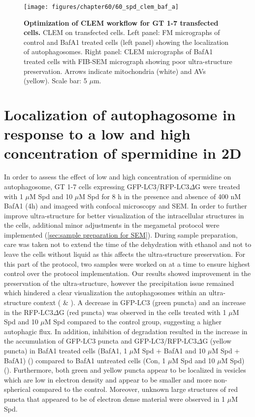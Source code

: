 \begin{landscape}
\begin{figure}[!htbp]
\center
  \texttt{[image: figures/chapter60/60\_spd\_clem\_baf\_a]}
  \caption[Optimization of CLEM workflow for GT 1-7 transfected cells]{\textbf{Optimization of CLEM workflow for GT 1-7 transfected cells.} CLEM on transfected cells. Left panel: FM micrographs of control and BafA1 treated cells (left panel) showing the localization of autophagosomes. Right panel: CLEM micrographs of BafA1 treated cells with FIB-SEM micrograph showing poor ultra-structure preservation. Arrows indicate mitochondria (white) and AVs (yellow). Scale bar: 5 $\mu$m.}
  \label{fig:60_spd_clem_baf_a}
\end{figure} 
\end{landscape}

\section{Localization of autophagosome in response to a low and high concentration of spermidine in 2D}
In order to assess the effect of low and high concentration of spermidine on autophagosome, GT 1-7 cells expressing GFP-LC3/RFP-LC3$\Delta$G were treated with 1 $\mu$M Spd and 10 $\mu$M Spd for 8 h in the presence and absence of 400 nM BafA1 (4h) and imageed with confocal microscopy and SEM. In order to further improve ultra-structure for better visualization of the intracellular structures in the cells, additional minor adjustments in the megametal protocol were implemented (\cref{sec:sample preparation for SEM}). During sample preparation, care was taken not to extend the time of the dehydration with ethanol and not to leave the cells without liquid as this affects the ultra-structure preservation. For this part of the protocol, two samples were worked on at a time to ensure highest control over the protocol implementation. Our results showed improvement in the preservation of the ultra-structure, however the precipitation issue remained which hindered a clear visualization the autophagosomes within an ultra-structure context ( \& ). A decrease in GFP-LC3 (green puncta) and an increase in the RFP-LC3$\Delta$G (red puncta) was observed in the cells treated with 1 $\mu$M Spd and 10 $\mu$M Spd compared to the control group, suggesting a higher autophagic flux. In addition, inhibition of degradation resulted in the increase in the accumulation of GFP-LC3 puncta  and GFP-LC3/RFP-LC3$\Delta$G (yellow puncta) in BafA1 treated cells (BafA1, 1 $\mu$M Spd + BafA1 and 10 $\mu$M Spd + BafA1) () compared to BafA1 untreated cells (Con, 1 $\mu$M Spd and 10 $\mu$M Spd) (). Furthermore, both green and yellow puncta appear to be localized in vesicles which are low in electron density and appear to be smaller and more non-spherical compared to the control. Moreover, unknown large structures of red puncta that appeared to be of electron dense material were observed in 1 $\mu$M Spd. 

